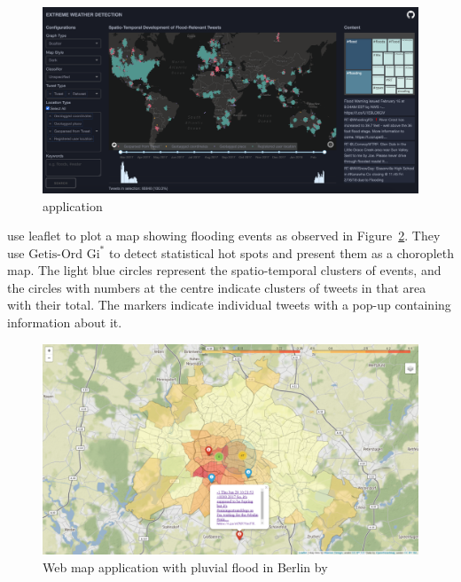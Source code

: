 \begin{figure}[H]
\begin{center}
  \includegraphics[width=\columnwidth]{./images/peter.png}
\end{center}
\caption{ application}
\label{fig:peter}
\end{figure}

 use leaflet to plot a map showing flooding events as
observed in Figure~\ref{fig:feng}. They use $\text{Getis-Ord Gi}^{\ast}$ \cite{ordLocalSpatialAutocorrelation2010}
to detect statistical hot spots and present them as a choropleth map. The light blue circles
represent the spatio-temporal clusters of events, and the circles with numbers at the centre
indicate clusters of tweets in that area with their total. The markers indicate individual tweets
with a pop-up containing information about it.

\begin{figure}[H]
\begin{center}
  \includegraphics[width=13cm]{./images/feng.png}
\end{center}
\caption{Web map application with pluvial flood in Berlin by }
\label{fig:feng}
\end{figure}

